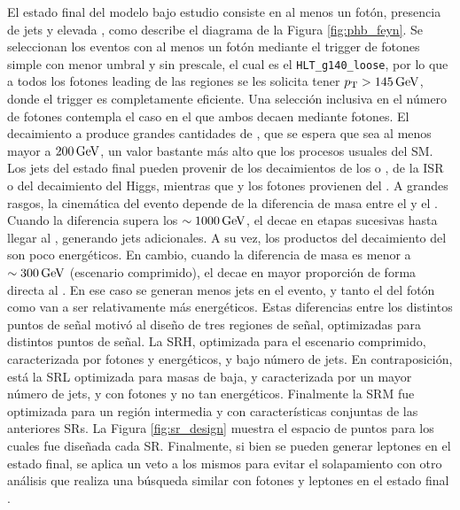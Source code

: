 El estado final del modelo bajo estudio consiste en al menos un fotón, presencia de jets y elevada \met, como describe el diagrama de la Figura \ref{fig:phb_feyn}. 
Se seleccionan los eventos con al menos un fotón mediante 
el trigger de fotones simple con menor umbral y sin prescale, el cual es el \texttt{HLT\_g140\_loose}, por lo que a todos los fotones leading de las regiones se les solicita tener $p_{\text{T}}>145\,\text{GeV}$, donde el trigger es completamente eficiente. Una selección inclusiva en el número de fotones contempla el caso en el que ambos \ninoone decaen mediante fotones. El decaimiento a \gravino produce grandes cantidades de \met, que se espera que sea al menos mayor a $200\,\text{GeV}$, un valor bastante más alto que los procesos usuales del SM. 
Los jets del estado final pueden provenir de los decaimientos de los \chinoonepm o \ninotwo, de la ISR o del decaimiento del Higgs, mientras que \met y los fotones provienen del \ninoone.
A grandes rasgos, la cinemática del evento depende de la diferencia de masa entre el \gluino y el \ninoone. 
Cuando la diferencia supera los $\sim 1000\,\text{GeV}$, el \gluino decae en etapas sucesivas hasta llegar al \ninoone, generando jets adicionales. A su vez, los productos del decaimiento del \ninoone son poco energéticos. En cambio, cuando la diferencia de masa es menor a $\sim 300\,\text{GeV}$ (escenario comprimido), el \gluino decae en mayor proporción de forma directa al \ninoone. En ese caso se generan menos jets en el evento, y tanto el \pt del fotón como \met van a ser relativamente más energéticos.
Estas diferencias entre los distintos puntos de señal motivó al diseño de tres regiones de señal, optimizadas para distintos puntos de señal. La SRH, optimizada para el escenario comprimido, caracterizada por fotones y \met energéticos, y bajo número de jets. En contraposición, está la SRL optimizada para masas de \ninoone baja, y caracterizada por un mayor número de jets, y con fotones y \met no tan energéticos. Finalmente la SRM fue optimizada para un región intermedia y con características conjuntas de las anteriores SRs. La Figura \ref{fig:sr_design} muestra el espacio de puntos para los cuales fue diseñada cada SR. Finalmente, si bien se pueden generar leptones en el estado final, se aplica un veto a los mismos para evitar el solapamiento con otro análisis que realiza una búsqueda similar con fotones y leptones en el estado final \cite{diph_8TeV}.

